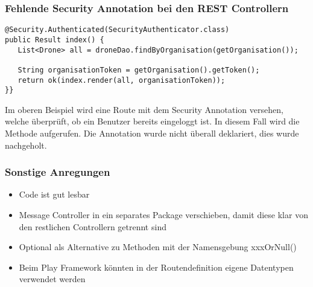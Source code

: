 \subsubsection{Fehlende Security Annotation bei den REST Controllern}
\begin{lstlisting}
@Security.Authenticated(SecurityAuthenticator.class)
public Result index() {
   List<Drone> all = droneDao.findByOrganisation(getOrganisation());
   
   String organisationToken = getOrganisation().getToken();
   return ok(index.render(all, organisationToken));
}}
\end{lstlisting}

Im oberen Beispiel wird eine Route mit dem Security Annotation versehen, welche überprüft, ob ein Benutzer bereits eingeloggt ist. In diesem Fall wird die Methode aufgerufen. Die Annotation wurde nicht überall deklariert, dies wurde nachgeholt.


\subsubsection{Sonstige Anregungen}
\begin{itemize}
	\item{Code ist gut lesbar}
	\item{Message Controller in ein separates Package verschieben, damit diese klar von den restlichen Controllern getrennt sind}
	\item{Optional als Alternative zu Methoden mit der Namensgebung xxxOrNull()}
	\item{
	Beim Play Framework könnten in der Routendefinition eigene Datentypen verwendet werden }
\end{itemize}
